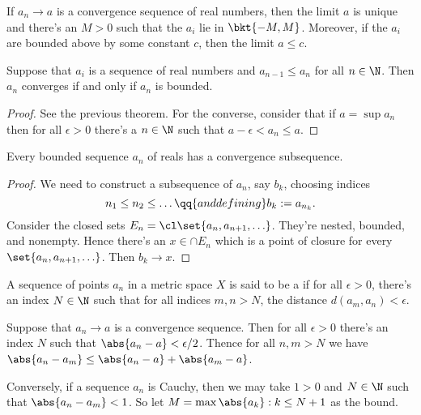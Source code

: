 \begin{thm}
    \label{thm:sequences_and_limits}
    If $a_n \to a$ is a convergence sequence of real numbers, then the limit $a$ is unique and there's an $M > 0$ such that the $a_i$ lie in $\bkt{-M, M}$. Moreover, if the $a_i$ are bounded above by some constant $c$, then the limit $a \le c$.
\end{thm}

\begin{thm}
    \label{thm:monotone_convergence_theorem}
    Suppose that $a_i$ is a sequence of real numbers and $a_{n-1} \le a_n$ for all $n \in \N$. Then $a_n$ converges if and only if $a_n$ is bounded.
\end{thm}

\begin{proof}
See the previous theorem. For the converse, consider that if $a = \sup a_n$ then for all $\epsilon > 0$ there's a $n \in \N$ such that $a - \epsilon < a_n \le a$.
\end{proof}

\begin{thm}
    \label{thm:bolzano_weierstrauss}
    Every bounded sequence $a_n$ of reals has a convergence subsequence.
\end{thm}

\begin{proof}
We need to construct a subsequence of $a_n$, say $b_k$, choosing indices
\begin{equation*}
    n_1 \le n_2 \le \ldots \qq{and defining} b_k := a_{n_k}.
\end{equation*}
    Consider the closed sets $E_n = \cl \set{a_n, a_{n+1}, \ldots}$. They're nested, bounded, and nonempty. Hence there's an $x \in \cap E_n$ which is a point of closure for every $\set{a_n, a_{n+1}, \ldots}$. Then $b_k \to x$.
\end{proof}

\begin{defn}
    \label{defn:cauchy_sequence}
    A sequence of points $a_n$ in a metric space $X$ is said to be a  if for all $\epsilon > 0$, there's an index $N \in \N$ such that for all indices $m,n > N$, the distance $d(a_m, a_n) < \epsilon$.
\end{defn}

\begin{thm}
    \label{thm:cauchy_criterion_for_r_}
    Suppose that $a_n \to a$ is a convergence sequence. Then for all $\epsilon > 0$ there's an index $N$ such that $\abs{a_n - a} < \epsilon/2$. Thence for all $n,m > N$ we have $\abs{a_n - a_m} \le \abs{a_n - a} + \abs{a_m - a}$.

    Conversely, if a sequence $a_n$ is Cauchy, then we may take $1> 0$ and $N \in \N$ such that $\abs{a_n - a_m} < 1$. So let $M = \max{\abs{a_k} : k \le N} + 1$ as the bound. \TODO
\end{thm}

